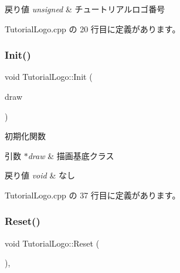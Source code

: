 \begin{DoxyRetVals}{戻り値}
{\em unsigned} & チュートリアルロゴ番号 \\
\hline
\end{DoxyRetVals}


 Tutorial\+Logo.\+cpp の 20 行目に定義があります。

\mbox{\label{class_tutorial_logo_a590f017a6b0532d08c1377b90b8fba3f}} 
\subsubsection{\texorpdfstring{Init()}{Init()}}
{\footnotesize\ttfamily void Tutorial\+Logo\+::\+Init (\begin{DoxyParamCaption}\item[{\mbox{\hyperlink{class_draw_base}{Draw\+Base}} $\ast$}]{draw }\end{DoxyParamCaption})}



初期化関数 


\begin{DoxyParams}{引数}
{\em $\ast$draw} & 描画基底クラス \\
\hline
\end{DoxyParams}

\begin{DoxyRetVals}{戻り値}
{\em void} & なし \\
\hline
\end{DoxyRetVals}


 Tutorial\+Logo.\+cpp の 37 行目に定義があります。

\mbox{\label{class_tutorial_logo_a2c9e22c81cfeafbd34f50cc766a66cf1}} 
\subsubsection{\texorpdfstring{Reset()}{Reset()}}
{\footnotesize\ttfamily void Tutorial\+Logo\+::\+Reset (\begin{DoxyParamCaption}{ }\end{DoxyParamCaption})\hspace{0.3cm}{\ttfamily [override]}, {\ttfamily [virtual]}}



